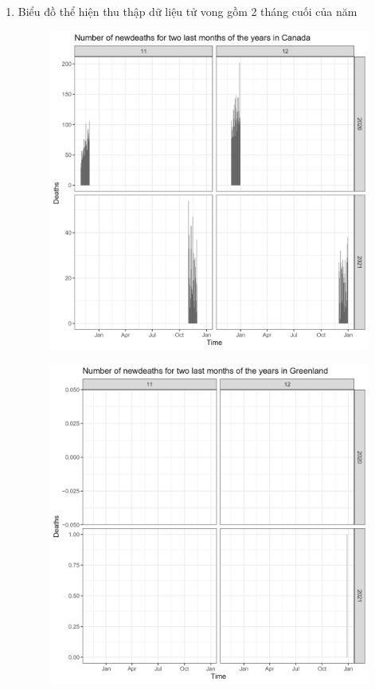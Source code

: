 \documentclass[a4paper]{article}
\theoremstyle{definition}
\begin{document}
\begin{enumerate}[i)]
\begin{enumerate}[1)]
\begin{figure}[H]
			\end{figure}
			\item Biểu đồ thể hiện thu thập dữ liệu tử vong gồm 2 tháng cuối của năm
			\begin{figure}[H]
				\centering
				\includegraphics[scale=0.25]{images/6.5.1.png}
			\end{figure}
			\begin{figure}[H]
				\centering
				\includegraphics[scale=0.25]{images/6.5.2.png}

\end{figure}
\end{enumerate}
\end{enumerate}
\end{document}

